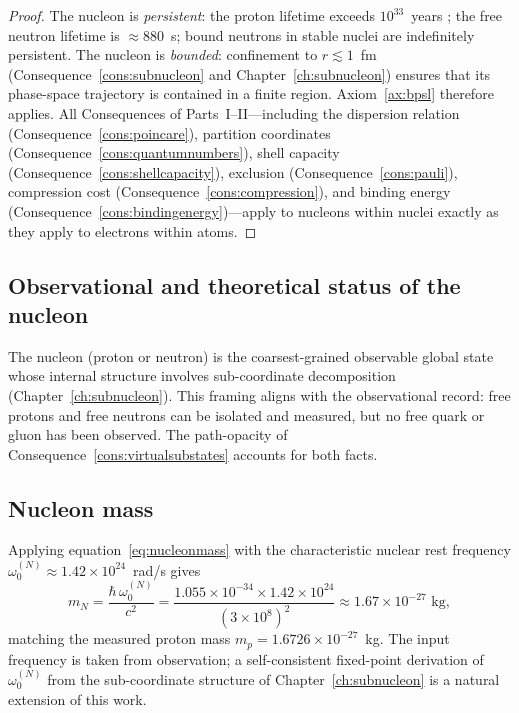 \begin{proof}
The nucleon is \emph{persistent}: the proton lifetime exceeds $10^{33}$~years
\citep{codata2018}; the free neutron lifetime is $\approx 880$~s; bound
neutrons in stable nuclei are indefinitely persistent.  The nucleon is
\emph{bounded}: confinement to $r\lesssim 1$~fm (Consequence~\ref{cons:subnucleon}
and Chapter~\ref{ch:subnucleon}) ensures that its phase-space trajectory is
contained in a finite region.  Axiom~\ref{ax:bpsl} therefore applies.  All
Consequences of Parts~I--II---including the dispersion relation
(Consequence~\ref{cons:poincare}), partition coordinates
(Consequence~\ref{cons:quantumnumbers}), shell capacity
(Consequence~\ref{cons:shellcapacity}), exclusion
(Consequence~\ref{cons:pauli}), compression cost
(Consequence~\ref{cons:compression}), and binding energy
(Consequence~\ref{cons:bindingenergy})---apply to nucleons within nuclei
exactly as they apply to electrons within atoms.
\end{proof}

\subsection{Observational and theoretical status of the nucleon}
\label{subsec:nucleonstatus}

The nucleon (proton or neutron) is the coarsest-grained observable global
state whose internal structure involves sub-coordinate decomposition
(Chapter~\ref{ch:subnucleon}).  This framing aligns with the observational
record: free protons and free neutrons can be isolated and measured, but no
free quark or gluon has been observed.  The path-opacity of
Consequence~\ref{cons:virtualsubstates} accounts for both facts.

\subsection{Nucleon mass}
\label{subsec:nucleonmass}

Applying equation~\eqref{eq:nucleonmass} with the characteristic nuclear
rest frequency $\omega_{0}^{(N)}\approx 1.42\times 10^{24}$~rad/s gives
\[
  m_{N}
  = \frac{\hbar\,\omega_{0}^{(N)}}{c^{2}}
  = \frac{1.055\times 10^{-34}\times 1.42\times 10^{24}}{(3\times 10^{8})^{2}}
  \approx 1.67\times 10^{-27}\text{ kg},
\]
matching the measured proton mass $m_{p}=1.6726\times 10^{-27}$~kg.  The
input frequency is taken from observation; a self-consistent fixed-point
derivation of $\omega_{0}^{(N)}$ from the sub-coordinate structure of
Chapter~\ref{ch:subnucleon} is a natural extension of this work.

